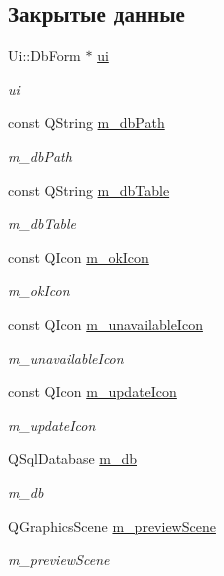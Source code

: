 \subsection*{Закрытые данные}
\begin{DoxyCompactItemize}
\item 
Ui\+::\+Db\+Form $\ast$ \hyperlink{classDbForm_a481b25bcbc8d2613cf09e786319e9559}{ui}
\begin{DoxyCompactList}\small\item\em ui \end{DoxyCompactList}\item 
const Q\+String \hyperlink{classDbForm_a8db1268928d78d414fd354cbc08c92c8}{m\+\_\+db\+Path}
\begin{DoxyCompactList}\small\item\em m\+\_\+db\+Path \end{DoxyCompactList}\item 
const Q\+String \hyperlink{classDbForm_a13a6b5d290951dfb001cfe34324c1634}{m\+\_\+db\+Table}
\begin{DoxyCompactList}\small\item\em m\+\_\+db\+Table \end{DoxyCompactList}\item 
const Q\+Icon \hyperlink{classDbForm_a8231b5e3687e61e8b3391040f99f33fe}{m\+\_\+ok\+Icon}
\begin{DoxyCompactList}\small\item\em m\+\_\+ok\+Icon \end{DoxyCompactList}\item 
const Q\+Icon \hyperlink{classDbForm_a664eef6253a7345bd09b820346c0e3c9}{m\+\_\+unavailable\+Icon}
\begin{DoxyCompactList}\small\item\em m\+\_\+unavailable\+Icon \end{DoxyCompactList}\item 
const Q\+Icon \hyperlink{classDbForm_ac2f11a495462056b06da8e3d62a04c22}{m\+\_\+update\+Icon}
\begin{DoxyCompactList}\small\item\em m\+\_\+update\+Icon \end{DoxyCompactList}\item 
Q\+Sql\+Database \hyperlink{classDbForm_a8baa011f5fa0625622b5930977ae8492}{m\+\_\+db}
\begin{DoxyCompactList}\small\item\em m\+\_\+db \end{DoxyCompactList}\item 
Q\+Graphics\+Scene \hyperlink{classDbForm_a2f5838603cedc772f92fc47cd484c93a}{m\+\_\+preview\+Scene}
\begin{DoxyCompactList}\small\item\em m\+\_\+preview\+Scene \end{DoxyCompactList}\end{DoxyCompactItemize}
